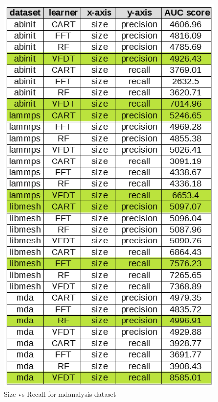 \documentclass[sigplan]{acmart}\settopmatter{printfolios=true,printccs=false,printacmref=false}
\begin{document}
\begin{figure}[h]
	\includegraphics[width=\linewidth]{fig/auc-size.png}
	\caption{Size vs Recall for mdanalysis dataset}
	\label{fig:auc-size}
\end{figure}
\end{document}

